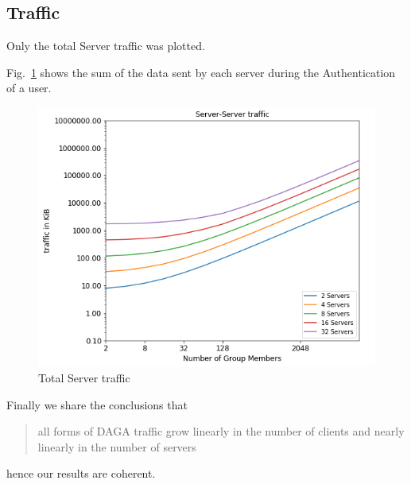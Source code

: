     \subsection{Traffic}

    Only the total Server traffic was plotted.

    Fig.~\ref{fig:servertraffic} %
    shows the sum of the data sent by each server during the Authentication of a user.

    \begin{figure}
        \centering
        \includegraphics[width=.65\linewidth]{images/plots/serverservertraffic.png} %
        \vspace*{1cm}
        \caption{Total Server traffic}
        \label{fig:servertraffic}
    \end{figure}

    Finally we share the conclusions that \blockquote{
        all forms of DAGA traffic grow linearly in the number of clients and nearly linearly in the number of servers
    }\cite{syta_identity_2015} hence our results are coherent.



